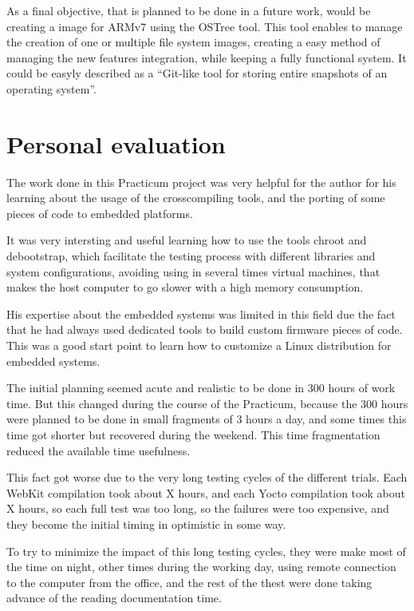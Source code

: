 \documentclass[a4paper,11pt,openany]{report}
\begin{document}
As a final objective, that is planned to be done in a future work, would be creating a image for ARMv7 using the OSTree\cite{ostree} tool. This tool enables to manage the creation of one or multiple file system images, creating a easy method of managing the new features integration, while keeping a fully functional system. It could be easyly described as a ``Git-like tool for storing entire snapshots of an operating system''.

\chapter{Personal evaluation}
The work done in this Practicum project was very helpful for the author for his learning about the usage of the crosscompiling tools, and the porting of some pieces of code to embedded platforms.

It was very intersting and useful learning how to use the tools chroot and debootstrap, which facilitate the testing process with different libraries and system configurations, avoiding using in several times virtual machines, that makes the host computer to go slower with a high memory consumption.

His expertise about the embedded systems was limited in this field due the fact that he had always used dedicated tools to build custom firmware pieces of code. This was a good start point to learn how to customize a Linux distribution for embedded systems.

The initial planning seemed acute and realistic to be done in 300 hours of work time. But this changed during the course of the Practicum, because the 300 hours were planned to be done in small fragments of 3 hours a day, and some times this time got shorter but recovered during the weekend. This time fragmentation reduced the available time usefulness.

This fact got worse due to the very long testing cycles of the different trials. Each WebKit compilation took about X hours, and each Yocto compilation took about X hours, so each full test was too long, so the failures were too expensive, and they become the initial timing in optimistic in some way.

To try to minimize the impact of this long testing cycles, they were make most of the time on night, other times during the working day, using remote connection to the computer from the office, and the rest of the thest were done taking advance of the reading documentation time.
\end{document}
